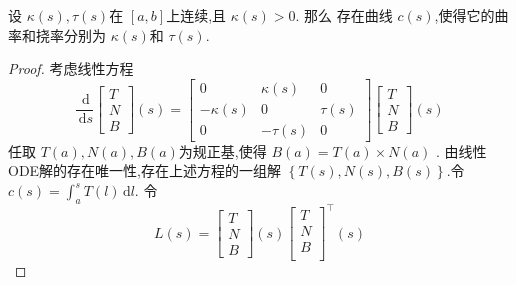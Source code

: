 \documentclass[../../古典微分几何.tex]{subfiles}
\begin{document}
\begin{theorem}
    设 \(   \kappa \left( s \right),\tau \left( s \right)    \)在 \(  \left[ a,b \right]   \)上连续,且 \(   \kappa \left( s \right)>0   \).
    那么 存在曲线 \(  c\left( s \right)   \),使得它的曲率和挠率分别为 \(   \kappa \left( s \right)   \)和 \(  \tau \left( s \right)   \).      
\end{theorem}
\begin{proof}
    考虑线性方程 \[
    \frac{\,\mathrm{d}  }{\,\mathrm{d} s } \begin{bmatrix} 
        T\\ 
         N\\ 
          B 
    \end{bmatrix}\left( s \right) =  \begin{bmatrix} 
        0& \kappa \left( s \right)&0\\ 
         - \kappa \left( s \right)&0&\tau \left( s \right)\\ 
          0&-\tau \left( s \right)&0     
    \end{bmatrix} \begin{bmatrix} 
        T\\ 
         N\\ 
          B 
    \end{bmatrix}\left( s \right)      
    \]任取 \(  T\left( a \right), N\left( a \right)    ,B\left( a \right) \)为规正基,使得 \(  B\left( a \right)= T\left( a \right)\times N\left( a \right)     \)  .
    由线性ODE解的存在唯一性,存在上述方程的一组解 \(  \left\{ T\left( s \right),N\left( s \right),B\left( s \right)    \right\}  \).令 \(  c\left( s \right)=  \int_{a}^{s}T\left( l \right)\,\mathrm{d} l    \).  
    令 \[
    L\left( s \right)=  \begin{bmatrix} 
        T\\ 
         N\\ 
          B 
    \end{bmatrix}\left( s \right) \begin{bmatrix} 
        T\\ 
         N\\ 
          B\\ 
            
    \end{bmatrix}^{\top}  \left( s \right)     
    \]


\end{proof}
\end{document}
